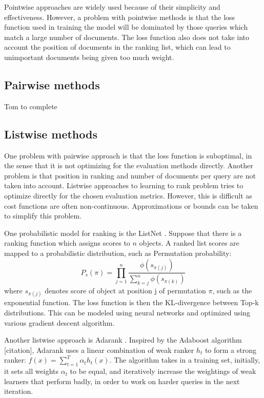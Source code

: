 \documentclass[english]{article}
\theoremstyle{definition}
\begin{document}
\begin{multicols}{2}
Pointwise approaches are widely used because of their simplicity and effectiveness.  However, a problem with pointwise methods is that the loss function used in training the model will be dominated by those queries which match a large number of documents.  The loss function also does not take into account the position of documents in the ranking list, which can lead to unimportant documents being given too much weight.

\subsection{Pairwise methods}

Tom to complete

\subsection{Listwise methods}

One problem with pairwise approach is that the loss function is suboptimal, in the sense that it is not optimizing for the evaluation methods directly. Another problem is that position in ranking and number of documents per query are not taken into account. Listwise approaches to learning to rank problem tries to optimize directly for the chosen evaluation metrics. However, this is difficult as cost functions are often non-continuous. Approximations or bounds can be taken to simplify this problem.

One probabilistic model for ranking is the ListNet \cite{cao2007learning}. Suppose that there is a ranking function which assigns scores to $n$ objects. A ranked list scores are mapped to a probabilistic distribution, such as Permutation probability:
$$P_s(\pi) = \prod_{j=1}^n \frac{\phi(s_{\pi(j)})}{\sum^n_{k=j} \phi(s_{\pi(k)})} $$
where $s_{\pi(j)}$ denotes score of object at position j of permutation $\pi$, such as the exponential function. The loss function is then the KL-divergence between Top-k distributions. This can be modeled using neural networks and optimized using various gradient descent algorithm.

Another listwise approach is Adarank \cite{xu2007adarank}. Inspired by the Adaboost algorithm [citation], Adarank uses a linear combination of weak ranker $h_t$ to form a strong ranker: $f(x) = \sum^T_{t=1} \alpha_t h_t(x)$. The algorithm takes in a training set, initially, it sets all weights $\alpha_t$ to be equal, and iteratively increase the weightings of weak learners that perform badly, in order to work on harder queries in the next iteration. 


\end{multicols}
\end{document}
